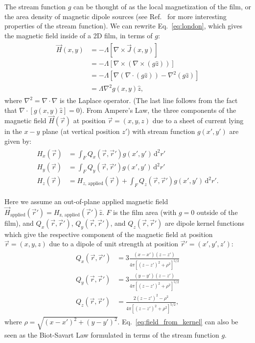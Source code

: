 \documentclass[final,3p,times,twocolumn]{elsarticle}
\newcounter{bla}
\begin{document}
The stream function $g$ can be thought of as the local magnetization of the film, or the area density of magnetic dipole sources (see Ref.~\cite{Brandt2005-wj} for more interesting properties of the stream function). We can rewrite Eq.~\ref{eq:london}, which gives the magnetic field inside of a 2D film, in terms of $g$:
\begin{align}
    \label{eq:london_stream}
    \begin{split}
        \vec{H}(x, y) &= -\Lambda\left[\nabla\times\vec{J}(x, y)\right]\\
        &= -\Lambda\left[\nabla\times\left(\nabla\times(g\hat{z})\right)\right]\\
        &= -\Lambda\left[\nabla(\nabla\cdot(g\hat{z}))-\nabla^2(g\hat{z})\right]\\
        &=\Lambda\nabla^2g(x,y)\hat{z},
    \end{split}
\end{align}
where $\nabla^2=\nabla\cdot\nabla$ is the Laplace operator. (The last line follows from the fact that $\nabla\cdot\left[g(x,y)\hat{z}\right] = 0$). From Ampere's Law, the three components of the magnetic field $\vec{H}(\vec{r})$ at position $\vec{r}=(x, y, z)$ due to a sheet of current lying in the $x-y$ plane (at vertical position $z'$) with stream function $g(x', y')$ are given by:
\begin{align}
    \label{eq:field_from_kernel}
    \begin{split}
        H_x(\vec{r}) &= \int_F Q_x(\vec{r},\vec{r}')g(x', y')\,\mathrm{d}^2r'\\
        H_y(\vec{r}) &= \int_F Q_y(\vec{r},\vec{r}')g(x', y')\,\mathrm{d}^2r'\\
        H_z(\vec{r}) &= H_{z,\,\mathrm{applied}}(\vec{r})
        + \int_F Q_z(\vec{r},\vec{r}')g(x', y')\,\mathrm{d}^2r'.  
    \end{split}
\end{align}

Here we assume an out-of-plane applied magnetic field $\vec{H}_\mathrm{applied}(\vec{r}')=H_\mathrm{z,\,\mathrm{applied}}(\vec{r}')\hat{z}$. $F$ is the film area (with $g = 0$ outside of the film), and $Q_x(\vec{r},\vec{r}')$, $Q_y(\vec{r},\vec{r}')$, and $Q_z(\vec{r},\vec{r}')$ are dipole kernel functions which give the respective component of the magnetic field at position $\vec{r}=(x, y, z)$ due to a dipole of unit strength at position $\vec{r}'=(x', y', z')$:
\begin{align}
    \label{eq:kernels}
    \begin{split}
        Q_x(\vec{r}, \vec{r}') &=  3\frac{(x-x')(z-z')}
        {4\pi[(z-z')^2+\rho^2]^{5/2}}\\
        Q_y(\vec{r}, \vec{r}') &=  3\frac{(y-y')(z-z')}
        {4\pi[(z-z')^2+\rho^2]^{5/2}}\\
        Q_z(\vec{r}, \vec{r}') &=  \frac{2(z-z')^2-\rho^2}
        {4\pi[(z-z')^2+\rho^2]^{5/2}},
    \end{split}
\end{align}
where $\rho=\sqrt{(x-x')^2 + (y-y')^2}$. Eq.~\ref{eq:field_from_kernel} can also be seen as the Biot-Savart Law formulated in terms of the stream function $g$.
\end{document}
